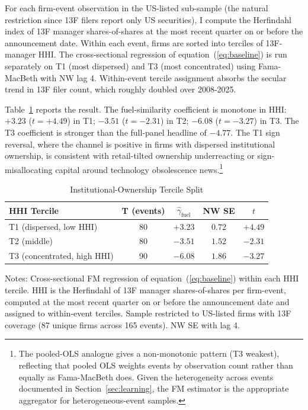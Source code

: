 \documentclass[12pt,a4paper]{article}
\begin{document}
For each firm-event observation in the US-listed sub-sample (the natural restriction since 13F filers report only US securities), I compute the Herfindahl index of 13F manager shares-of-shares at the most recent quarter on or before the announcement date. Within each event, firms are sorted into terciles of 13F-manager HHI. The cross-sectional regression of equation~(\ref{eq:baseline}) is run separately on T1 (most dispersed) and T3 (most concentrated) using Fama-MacBeth with NW lag 4. Within-event tercile assignment absorbs the secular trend in 13F filer count, which roughly doubled over 2008-2025.

Table~\ref{tab:institutional_split} reports the result. The fuel-similarity coefficient is monotone in HHI: $+3.23$ ($t = +4.49$) in T1; $-3.51$ ($t = -2.31$) in T2; $-6.08$ ($t = -3.27$) in T3. The T3 coefficient is stronger than the full-panel headline of $-4.77$. The T1 sign reversal, where the channel is positive in firms with dispersed institutional ownership, is consistent with retail-tilted ownership underreacting or sign-misallocating capital around technology obsolescence news.\footnote{The pooled-OLS analogue gives a non-monotonic pattern (T3 weakest), reflecting that pooled OLS weights events by observation count rather than equally as Fama-MacBeth does. Given the heterogeneity across events documented in Section~\ref{sec:learning}, the FM estimator is the appropriate aggregator for heterogeneous-event samples.}

\begin{table}[H]
\centering
\caption{Institutional-Ownership Tercile Split}
\label{tab:institutional_split}
\begin{tabular}{lcccc}
\toprule
HHI Tercile & T (events) & $\hat\gamma_{\text{fuel}}$ & NW SE & $t$ \\
\midrule
T1 (dispersed, low HHI) & 80 & $+3.23$ & $0.72$ & $+4.49$ \\
T2 (middle) & 80 & $-3.51$ & $1.52$ & $-2.31$ \\
T3 (concentrated, high HHI) & 90 & $-6.08$ & $1.86$ & $-3.27$ \\
\bottomrule
\end{tabular}
\begin{flushleft}\footnotesize
Notes: Cross-sectional FM regression of equation~(\ref{eq:baseline}) within each HHI tercile. HHI is the Herfindahl of 13F manager shares-of-shares per firm-event, computed at the most recent quarter on or before the announcement date and assigned to within-event terciles. Sample restricted to US-listed firms with 13F coverage (87 unique firms across 165 events). NW SE with lag 4.
\end{flushleft}
\end{table}
\end{document}
